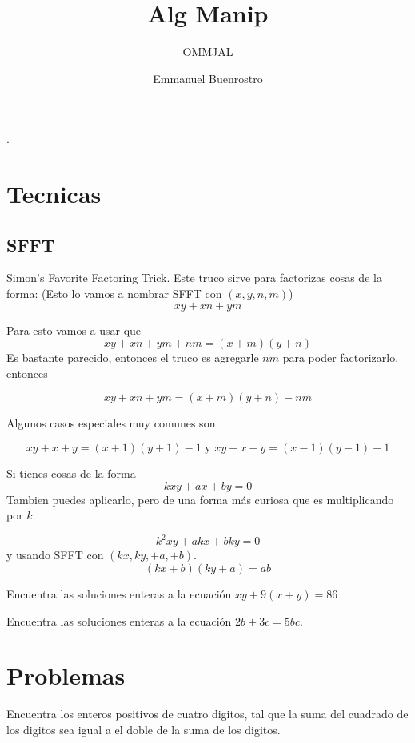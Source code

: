 \documentclass[11pt]{scrartcl}
\title{Alg Manip}
\subtitle{OMMJAL}
\author{Emmanuel Buenrostro}
\begin{document}
\maketitle.

\section{Tecnicas}

\subsection{SFFT}

Simon's Favorite Factoring Trick. Este truco sirve para factorizas cosas de la forma: (Esto lo vamos a nombrar SFFT con $(x,y,n,m)$)
\[ xy+xn+ym \]

Para esto vamos a usar que 
\[ xy+xn+ym+nm =(x+m)(y+n)\]
Es bastante parecido, entonces el truco es agregarle $nm$ para poder factorizarlo, entonces

\[ xy+xn+ym = (x+m)(y+n)-nm \]

Algunos casos especiales muy comunes son:

\[xy+x+y=(x+1)(y+1)-1  \text{ y } xy-x-y=(x-1)(y-1)-1\]

Si tienes cosas de la forma
\[ kxy+ax+by=0 \]
Tambien puedes aplicarlo, pero de una forma más curiosa que es multiplicando por $k$. 

\[ k^2xy +akx +bky =0\]
y usando SFFT con $(kx,ky,+a, +b)$.
\[(kx+b)(ky+a)=ab\]

\begin{example}
    [Brilliant]
    Encuentra las soluciones enteras a la ecuación $xy+9(x+y)=86$
\end{example}

\begin{example}
    [Brilliant]
    Encuentra las soluciones enteras a la ecuación $2b+3c=5bc$.
\end{example}



\newpage
\section{Problemas}


\begin{problem} %
    Encuentra los enteros positivos de cuatro digitos, tal que la suma del cuadrado
    de los digitos sea igual a el doble de la suma de los digitos.
\end{problem}
\end{document}

